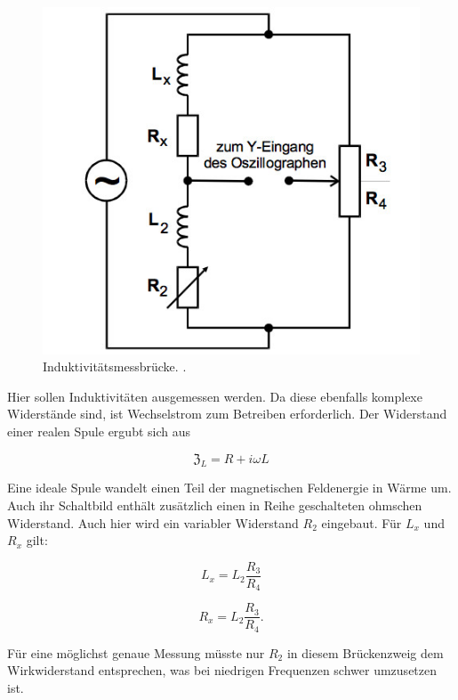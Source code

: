 \begin{figure}
  \centering
  \includegraphics[scale=0.5]{content/induktivitätsmessbrücke.jpg}
  \caption{Induktivitätsmessbrücke. \cite{anleitung302}.}
  \label{fig:induktivität}
\end{figure}

Hier sollen Induktivitäten ausgemessen werden. Da diese ebenfalls komplexe Widerstände sind, ist Wechselstrom zum Betreiben erforderlich.
Der Widerstand einer realen Spule ergubt sich aus

\begin{equation}
  \mathfrak{Z}_L = R + i\omega L
\end{equation}


Eine ideale Spule wandelt einen Teil der magnetischen Feldenergie in Wärme um. Auch ihr Schaltbild enthält zusätzlich einen in Reihe geschalteten ohmschen Widerstand.
Auch hier wird ein variabler Widerstand $R_{2}$ eingebaut.
Für $L_x$ und $R_x$ gilt:

\begin{equation}
  \label{eqn:ind1}
  L_x = L_{2} \frac{R_3}{R_4}
\end{equation}

\begin{equation}
  \label{eqn:ind2}
  R_x = L_{2} \frac{R_3}{R_4}.
\end{equation}

Für eine möglichst genaue Messung müsste nur $R_{2}$ in diesem Brückenzweig dem Wirkwiderstand entsprechen, was bei niedrigen Frequenzen schwer umzusetzen ist.

